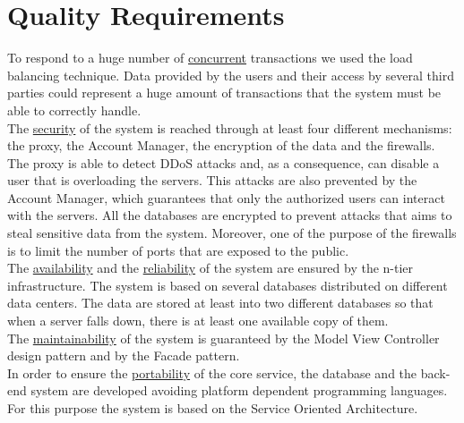 \section{Quality Requirements}
To respond to a huge number of \underline{concurrent} transactions we used the load balancing technique.
Data provided by the users and their access by several third parties could represent a huge amount of transactions that the system must be able to correctly handle.\\
The \underline{security} of the system is reached through at least four different mechanisms: the proxy, the Account Manager, the encryption of the data and the firewalls.\\
The proxy is able to detect DDoS attacks and, as a consequence, can disable a user that is overloading the servers.
This attacks are also prevented by the Account Manager, which guarantees that only the authorized users can interact with the servers.
All the databases are encrypted to prevent attacks that aims to steal sensitive data from the system.
Moreover, one of the purpose of the firewalls is to limit the number of ports that are exposed to the public.\\
The \underline{availability} and the \underline{reliability} of the system are ensured by the n-tier infrastructure. The system is based on several databases distributed on different data centers. The data are stored at least into two different databases so that when a server falls down, there is at least one available copy of them.\\
The \underline{maintainability} of the system is guaranteed by the Model View Controller design pattern and by the Facade pattern. \\
In order to ensure the \underline{portability} of the core service, the database and the back-end system are developed avoiding platform dependent programming languages. For this purpose the system is based on the Service Oriented Architecture.
